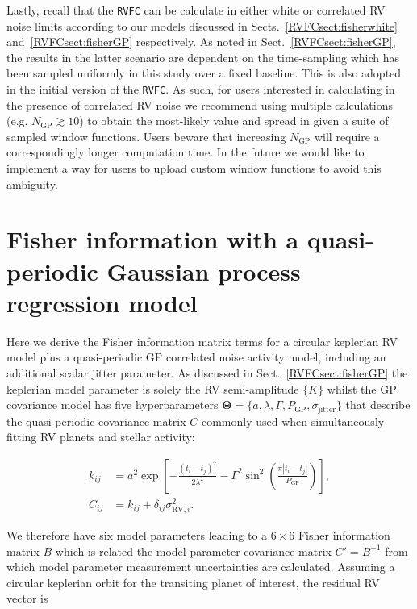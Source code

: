 Lastly, recall that the
\texttt{RVFC} can be calculate \nrv{} in either white or correlated RV noise limits according to
our models discussed in Sects.~\ref{RVFCsect:fisherwhite} and~\ref{RVFCsect:fisherGP} respectively. As noted in
Sect.~\ref{RVFCsect:fisherGP}, the results in the latter scenario are dependent on the time-sampling which has
been sampled uniformly in this study over a fixed baseline. This is also adopted in the initial version of
the \texttt{RVFC}. As such, for users interested in calculating \nrv{} in the presence of correlated RV noise
we recommend using multiple calculations (e.g. $N_{\text{GP}} \gtrsim 10$) to obtain the most-likely value and
spread in \nrv{} given a suite of sampled window functions. Users beware that increasing $N_{\text{GP}}$ will
require a correspondingly longer computation time.  
In the future we would like to implement a way for users to upload custom window functions to avoid this
ambiguity.


\section{Fisher information with a quasi-periodic Gaussian process regression model} \label{RVFCapp:fishergp}
Here we derive the Fisher information matrix terms for a circular keplerian RV model
plus a quasi-periodic GP correlated noise activity model, including an additional scalar jitter parameter.
As discussed in Sect.~\ref{RVFCsect:fisherGP}
the keplerian model parameter is solely the RV semi-amplitude $\{K \}$ whilst the GP covariance model has
five hyperparameters $\boldsymbol{\Theta} = \{a, \lambda, \Gamma, P_{\text{GP}}, \sigma_{\text{jitter}} \}$
that describe the quasi-periodic covariance matrix $C$ commonly used when simultaneously fitting RV planets
and stellar activity:

\begin{align}
  k_{ij} &= a^2 \exp{\left[ -\frac{(t_i-t_j)^2}{2 \lambda^2}
      -\Gamma^2 \sin^2{\left(\frac{\pi |t_i-t_j|}{P_{\text{GP}}} \right)} \right]}, \label{appeq:K1} \\
  C_{ij} &= k_{ij} + \delta_{ij} \sigma_{\text{RV},i}^2. \label{appeq:K2}
\end{align}
  
\noindent We therefore
have six model parameters leading to a $6 \times 6$ Fisher information matrix $B$ which is related
the model parameter covariance matrix $C'=B^{-1}$ from which model parameter measurement uncertainties
are calculated. Assuming a circular keplerian orbit for the transiting planet of interest, the residual
RV vector is

